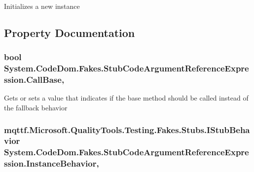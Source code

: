 Initializes a new instance



\subsection{Property Documentation}
\hypertarget{class_system_1_1_code_dom_1_1_fakes_1_1_stub_code_argument_reference_expression_a5ca292b6656a83c87e5c46aa42e49f85}{
\subsubsection[{Call\-Base}]{\setlength{\rightskip}{0pt plus 5cm}bool System.\-Code\-Dom.\-Fakes.\-Stub\-Code\-Argument\-Reference\-Expression.\-Call\-Base\hspace{0.3cm}{\ttfamily [get]}, {\ttfamily [set]}}}\label{class_system_1_1_code_dom_1_1_fakes_1_1_stub_code_argument_reference_expression_a5ca292b6656a83c87e5c46aa42e49f85}


Gets or sets a value that indicates if the base method should be called instead of the fallback behavior

\hypertarget{class_system_1_1_code_dom_1_1_fakes_1_1_stub_code_argument_reference_expression_a65457afffa3b3610e87cd640f5dfd6c0}{
\subsubsection[{Instance\-Behavior}]{\setlength{\rightskip}{0pt plus 5cm}mqttf.\-Microsoft.\-Quality\-Tools.\-Testing.\-Fakes.\-Stubs.\-I\-Stub\-Behavior System.\-Code\-Dom.\-Fakes.\-Stub\-Code\-Argument\-Reference\-Expression.\-Instance\-Behavior\hspace{0.3cm}{\ttfamily [get]}, {\ttfamily [set]}}}\label{class_system_1_1_code_dom_1_1_fakes_1_1_stub_code_argument_reference_expression_a65457afffa3b3610e87cd640f5dfd6c0}


